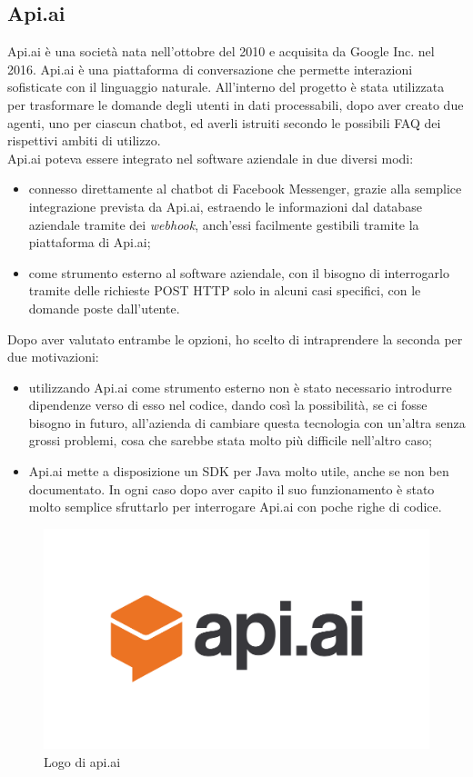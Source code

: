 \subsection{Api.ai}
Api.ai è una società nata nell'ottobre del 2010 e acquisita da Google Inc. nel 2016. Api.ai è una piattaforma di conversazione
che permette interazioni sofisticate con il linguaggio naturale. All'interno del progetto è stata utilizzata per trasformare le domande degli utenti in dati processabili, dopo aver creato due agenti, uno per ciascun \gls{chatbot}, ed averli istruiti secondo le possibili \gls{FAQ} dei rispettivi ambiti di utilizzo.\\
Api.ai poteva essere integrato nel software aziendale in due diversi modi:
\begin{itemize}
	\item connesso direttamente al \gls{chatbot} di Facebook Messenger, grazie alla semplice integrazione prevista da Api.ai, estraendo le informazioni dal database aziendale tramite dei \emph{webhook}, anch'essi facilmente gestibili tramite la piattaforma di Api.ai;
	\item come strumento esterno al software aziendale, con il bisogno di interrogarlo tramite delle richieste POST HTTP solo in alcuni casi specifici, con le domande poste dall'utente.
\end{itemize} 
Dopo aver valutato entrambe le opzioni, ho scelto di intraprendere la seconda per due motivazioni:
\begin{itemize}
	\item utilizzando Api.ai come strumento esterno non è stato necessario introdurre dipendenze verso di esso nel codice, dando così la possibilità, se ci fosse bisogno in futuro, all'azienda di cambiare questa tecnologia con un'altra senza grossi problemi, cosa che sarebbe stata molto più difficile nell'altro caso;
	\item Api.ai mette a disposizione un SDK per Java molto utile, anche se non ben documentato. In ogni caso dopo aver capito il suo funzionamento è stato molto semplice sfruttarlo per interrogare Api.ai con poche righe di codice. 
\end{itemize}
\begin{figure}[h]
	\centering
	\includegraphics[scale=0.2]{../Immagini/apiai.png}
	\caption{Logo di api.ai}
\end{figure}
